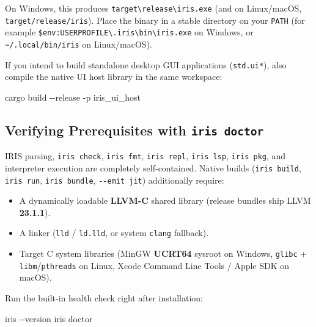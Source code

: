 \documentclass[
  english,
  oneside]{book}
\newenvironment{Shaded}{\begin{snugshade}}{\end{snugshade}}
\newcommand{\NormalTok}[1]{\textcolor[rgb]{0.83,0.83,0.83}{#1}}
\newcommand{\OperatorTok}[1]{\textcolor[rgb]{0.83,0.83,0.83}{#1}}
\providecommand{\tightlist}{%
  \setlength{\itemsep}{0pt}\setlength{\parskip}{0pt}}
\begin{document}
On Windows, this produces
\texttt{target\textbackslash{}release\textbackslash{}iris.exe} (and on
Linux/macOS, \texttt{target/release/iris}). Place the binary in a stable
directory on your \texttt{PATH} (for example
\texttt{\$env:USERPROFILE\textbackslash{}.iris\textbackslash{}bin\textbackslash{}iris.exe}
on Windows, or \texttt{\textasciitilde{}/.local/bin/iris} on
Linux/macOS).

If you intend to build standalone desktop GUI applications
(\texttt{std.ui*}), also compile the native UI host library in the same
workspace:

\begin{Shaded}
\begin{Highlighting}[]
\NormalTok{cargo build }\OperatorTok{{-}{-}}\NormalTok{release }\OperatorTok{{-}}\NormalTok{p iris\_ui\_host}
\end{Highlighting}
\end{Shaded}

\subsection{\texorpdfstring{Verifying Prerequisites with
\texttt{iris\ doctor}}{Verifying Prerequisites with iris doctor}}\label{verifying-prerequisites-with-iris-doctor}

IRIS parsing, \texttt{iris\ check}, \texttt{iris\ fmt},
\texttt{iris\ repl}, \texttt{iris\ lsp}, \texttt{iris\ pkg}, and
interpreter execution are completely self-contained. Native builds
(\texttt{iris\ build}, \texttt{iris\ run}, \texttt{iris\ bundle},
\texttt{-\/-emit\ jit}) additionally require:

\begin{itemize}
\tightlist
\item
  A dynamically loadable \textbf{LLVM-C} shared library (release bundles
  ship LLVM \textbf{23.1.1}).
\item
  A linker (\texttt{lld} / \texttt{ld.lld}, or system \texttt{clang}
  fallback).
\item
  Target C system libraries (MinGW \textbf{UCRT64} sysroot on Windows,
  \texttt{glibc} + \texttt{libm}/\texttt{pthreads} on Linux, Xcode
  Command Line Tools / Apple SDK on macOS).
\end{itemize}

Run the built-in health check right after installation:

\begin{Shaded}
\begin{Highlighting}[]
\NormalTok{iris {-}{-}version}
\NormalTok{iris doctor}
\end{Highlighting}
\end{Shaded}
\end{document}

